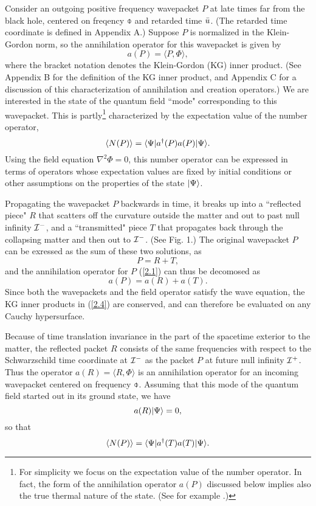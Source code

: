 Consider an outgoing positive frequency wavepacket $P$ at late
times far from the black hole, centered on
freqency $\obar$ and retarded time $\bar{u}$.
(The retarded time coordinate is
defined in Appendix A.) Suppose $P$ is normalized in the
Klein-Gordon norm, so the annihilation operator for this
wavepacket is given by
\begin{equation}
a(P)=\langle P,\Phi\rangle,
\label{2.1}
\end{equation}
where the bracket
notation denotes the Klein-Gordon (KG) inner product. (See
Appendix B for the definition of the KG inner product,
and Appendix C for a discussion of this
characterization of annihilation and creation operators.)
We are interested in the state of the quantum
field ``mode" corresponding to this wavepacket.
This is partly\footnote{For simplicity we focus on the
expectation value of the number operator. In fact, the form
of the annihilation operator $a(P)$ discussed below implies
also the true thermal nature of the state. (See for example
\cite{Wald75,DeWitt,Sork}.)}
characterized by the expectation value of the number operator,
\begin{equation} \langle N(P)\rangle
=\langle\Psi|a^{\dagger}(P)a(P)|\Psi\rangle.
\end{equation}
Using the field equation $\nabla^2\Phi=0$, this number operator
can be expressed  in terms of operators whose expectation
values are fixed by initial conditions or other assumptions
on the properties of the state $|\Psi\rangle$.

Propagating the wavepacket $P$ backwards in time, it
breaks up into a ``reflected piece" $R$ that scatters
off the curvature outside the matter and out to past null
infinity ${\cal I}^-$, and a ``transmitted" piece $T$
that propagates back through the collapsing matter and
then out to ${\cal I}^-$. (See Fig. 1.)
The original wavepacket $P$ can be
exressed as the sum of these two solutions, as
\begin{equation} P=R+T,
\end{equation}
and the annihilation operator for $P$ (\ref{2.1}) can thus
be decomosed as
\begin{equation} a(P)=a(R)+a(T).
\label{2.4}
\end{equation}
Since both the wavepackets and the field operator satisfy
the wave equation,
the KG inner products in (\ref{2.4}) are conserved, and can
therefore be evaluated on any Cauchy hypersurface.

Because of time translation invariance in the part of the
spacetime exterior to the matter, the reflected packet $R$
consists of the same frequencies with respect to
the Schwarzschild time
coordinate at ${\cal I}^-$ as the packet $P$ at future null
infinity ${\cal I}^+$. Thus the operator
$a(R)=\langle R,\Phi\rangle$ is an annihilation operator
for an incoming wavepacket centered on frequency $\obar$.
Assuming that this mode of
the quantum field started out in its ground state, we have
\begin{equation} a(R)|\Psi\rangle =0,
\end{equation}
so that
\begin{equation} \langle N(P)\rangle =\langle\Psi|a^{\dagger}(T)a(T)|\Psi\rangle.
\label{2.6}
\end{equation}

